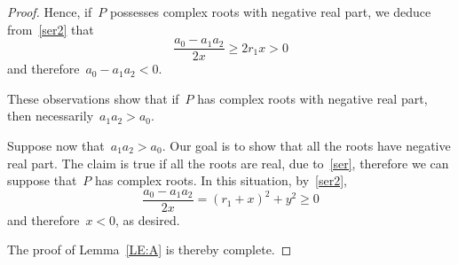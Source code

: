 \documentclass[10pt,a4paper]{amsart}
\renewcommand{\ge}{\geqslant}
\begin{document}
\begin{proof}
Hence, if~$P$ possesses complex roots with negative real part, we deduce from~\eqref{ser2} that
$$ \frac{a_0-a_1a_2}{2x}\ge 2 r_1 x>0$$
and therefore~$a_0-a_1a_2<0$.

These observations show that if~$P$ has complex
roots with negative real part, then necessarily~$a_1 a_2 > a_0 $.

Suppose now that~$a_1 a_2 > a_0 $. Our goal is to show that all the roots have negative
real part. The claim is true if all the roots are real, due to~\eqref{ser}, therefore
we can suppose that~$P$ has complex roots. In this situation, by~\eqref{ser2},
$$\frac{a_0-a_1a_2}{2x}=
(r_1 + x)^2 + y^2\ge0
$$and therefore~$x<0$, as desired.

The proof of Lemma~\ref{LE:A} is thereby complete.
\end{proof}
\end{document}
